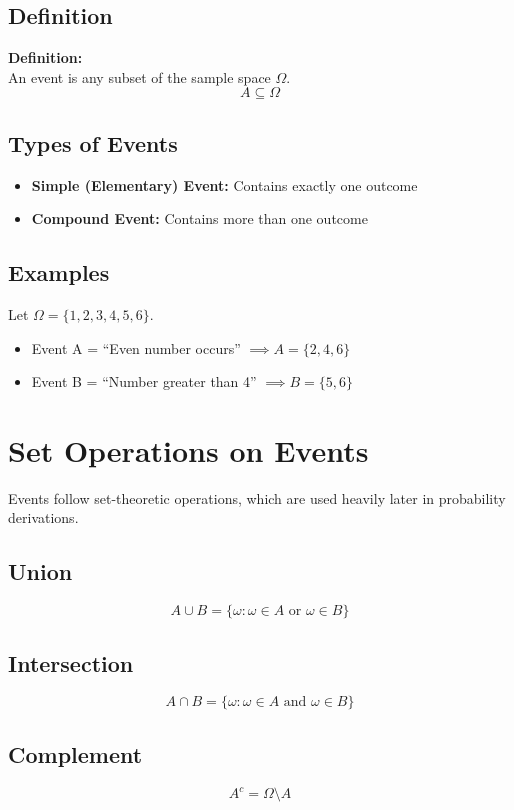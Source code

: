\documentclass[11pt]{article}
\begin{document}
\subsection{Definition}
\textbf{Definition:} \\
An event is any subset of the sample space $\Omega$.
\[ A \subseteq \Omega \]

\subsection{Types of Events}
\begin{itemize}
    \item \textbf{Simple (Elementary) Event:} Contains exactly one outcome
    \item \textbf{Compound Event:} Contains more than one outcome
\end{itemize}

\subsection{Examples}
Let $\Omega = \{1, 2, 3, 4, 5, 6\}$.
\begin{itemize}
    \item Event A = ``Even number occurs'' $\implies A = \{2, 4, 6\}$
    \item Event B = ``Number greater than 4'' $\implies B = \{5, 6\}$
\end{itemize}

\section{Set Operations on Events}
Events follow set-theoretic operations, which are used heavily later in probability derivations.

\subsection{Union}
\[ A \cup B = \{ \omega : \omega \in A \text{ or } \omega \in B \} \]

\subsection{Intersection}
\[ A \cap B = \{ \omega : \omega \in A \text{ and } \omega \in B \} \]

\subsection{Complement}
\[ A^c = \Omega \setminus A \]
\end{document}
